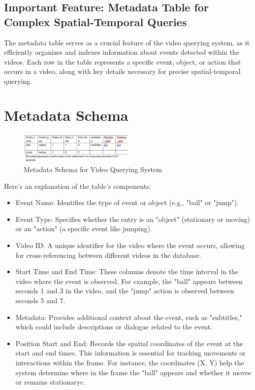 \documentclass[conference]{IEEEtran}
\begin{document}
\subsection{Important Feature: Metadata Table for Complex Spatial-Temporal Queries}

The metadata table serves as a crucial feature of the video querying system, as it efficiently organizes and indexes information about events detected within the videos. Each row in the table represents a specific event, object, or action that occurs in a video, along with key details necessary for precise spatial-temporal querying.

\section{Metadata Schema}
\begin{figure}[H]
    \centering
    \includegraphics[width=0.5\textwidth]{metadata_schema.png} 
    \caption{Metadata Schema for Video Querying System}
    \label{fig:metadata-schema}
\end{figure}

Here’s an explanation of the table’s components:
\begin{itemize}[itemsep=5pt]
    \item Event Name: Identifies the type of event or object (e.g., "ball" or "jump").
    \item Event Type: Specifies whether the entry is an "object" (stationary or moving) or an "action" (a specific event like jumping).
    \item Video ID: A unique identifier for the video where the event occurs, allowing for cross-referencing between different videos in the database.
    \item Start Time and End Time: These columns denote the time interval in the video where the event is observed. For example, the "ball" appears between seconds 1 and 3 in the video, and the "jump" action is observed between seconds 5 and 7.
    \item Metadata: Provides additional context about the event, such as "subtitles," which could include descriptions or dialogue related to the event.
    \item Position Start and End: Records the spatial coordinates of the event at the start and end times. This information is essential for tracking movements or interactions within the frame. For instance, the coordinates (X, Y) help the system determine where in the frame the "ball" appears and whether it moves or remains stationaryc.
\end{itemize}
    
\end{document}

